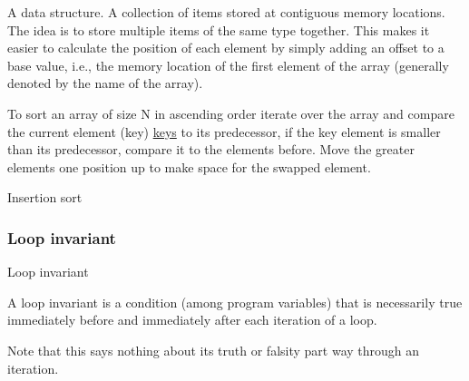   \begin{definition}[Arrays]\label{def:arrays_1}
      A data structure. A collection of items stored at contiguous memory locations. The idea is to store multiple items of the same type together. This makes it easier to calculate the position of each element by simply adding an offset to a base value, i.e., the memory location of the first element of the array (generally denoted by the name of the array).
  \end{definition}

\begin{eg}
To sort an array of size N in ascending order iterate over the array and compare the current element (key) \hyperref[def:keys_1]{keys} to its predecessor, if the key element is smaller than its predecessor, compare it to the elements before. Move the greater elements one position up to make space for the swapped element.
\end{eg}

\begin{algorithm}
\caption{Insertion sort}\label{alg:insertion_sort_1}
  \For{$i\gets2$ \KwTo $n$}{
  $key = A[1]$ \tcp*{Assign variable "key" to the index "i" of array "A"}
  
  $j = i - 1$ \tcp*{ Insert $A[1]$ into the sorted sub-array $A[1 : i -1]$}
  
  \tcc{Conditional check while true}
  \While{$j > 0$ and $A[j] > key$}{
  $A[j + 1] = A[j]$ \tcp*{Retrive value at index "j" and assign this value to the element at index $j + 1$}
  
  $j = j - 1$} \tcp*{Swap $j$ with the value at index $j - 1$}
  $A]j + 1] = key$
  }

\end{algorithm}



\subsubsection{Loop invariant}

\begin{definition*}
Loop invariant
\begin{definition}\label{def:loop_invariants_1}
    A loop invariant is a condition (among program variables) that is necessarily true immediately before and immediately after each iteration of a loop. 
\end{definition}
\begin{note}\label{note:loop_invariant_iteration_boolean_state_1}
    Note that this says nothing about its truth or falsity part way through an iteration.
\end{note}

\end{definition*}


